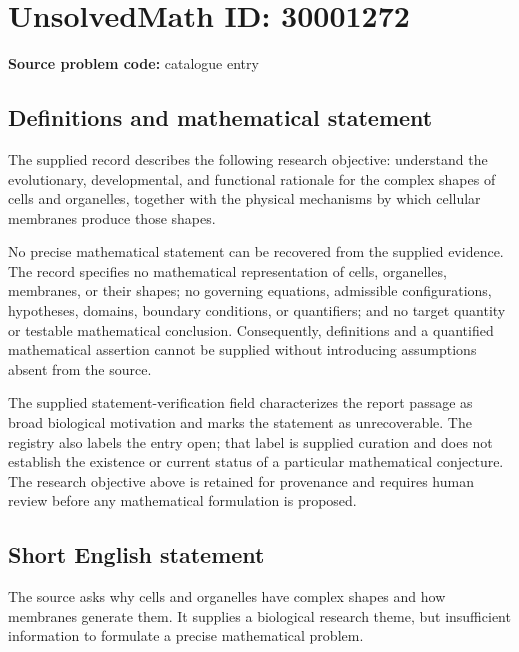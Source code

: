 \documentclass[11pt]{article}
\begin{document}
\section*{UnsolvedMath ID: 30001272}
\textbf{Source problem code:} catalogue entry
\subsection{Definitions and mathematical statement}
The supplied record describes the following research objective: understand the evolutionary, developmental, and functional rationale for the complex shapes of cells and organelles, together with the physical mechanisms by which cellular membranes produce those shapes.

No precise mathematical statement can be recovered from the supplied evidence. The record specifies no mathematical representation of cells, organelles, membranes, or their shapes; no governing equations, admissible configurations, hypotheses, domains, boundary conditions, or quantifiers; and no target quantity or testable mathematical conclusion. Consequently, definitions and a quantified mathematical assertion cannot be supplied without introducing assumptions absent from the source.

The supplied statement-verification field characterizes the report passage as broad biological motivation and marks the statement as unrecoverable. The registry also labels the entry open; that label is supplied curation and does not establish the existence or current status of a particular mathematical conjecture. The research objective above is retained for provenance and requires human review before any mathematical formulation is proposed.
\subsection{Short English statement}
The source asks why cells and organelles have complex shapes and how membranes generate them. It supplies a biological research theme, but insufficient information to formulate a precise mathematical problem.
\end{document}
